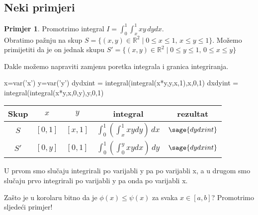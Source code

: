 \documentclass[a4paper, 11pt]{article}
\theoremstyle{plain}
\theoremstyle{plain}
\theoremstyle{definition}
\newtheorem{example}[definition]{Primjer}
\theoremstyle{remark}
\begin{document}
\subsection{Neki primjeri}
\begin{example}
    Promotrimo integral $I=\displaystyle \int_0^1 \int_x^1 xy\,dydx$.\\
    Obratimo pažnju na skup $S=\{(x,y) \in \mathbb{R}^2 \mid 0 \leq x \leq 1,\, x \leq y \leq1\}$.
    Možemo primijetiti da je on jednak skupu $S'=\{(x,y) \in \mathbb{R}^2 \mid 0 \leq y \leq 1,\, 0 \leq x \leq y \}$
    
   \noindent Dakle možemo napraviti zamjenu poretka integrala i granica integriranja.
    
    \begin{sagesilent}
    x=var('x')
    y=var('y')
    dydxint = integral(integral(x*y,y,x,1),x,0,1) 
    dxdyint = integral(integral(x*y,x,0,y),y,0,1) 

    \end{sagesilent}
    
\begin{center}
     \renewcommand{\arraystretch}{2.5}
    \begin{tabular}{ c c c c c }
     Skup & $x$     & $y$    & integral                                   & rezultat \bigstrut[b] \\ \hline
     $S$ & $[0,1]$ & $[x,1]$ & $\displaystyle \int_0^1 \left( \int_x^1 xy dy\right)\,dx$ & $\sage{dydxint}$ \bigstrut \\ \hline
     
     $S'$& $[0,y]$ & $[0,1]$ & $\displaystyle \int_0^1 \left(\int_0^y xy dx\right)\,dy$ & $\sage{dydxint}$ \bigstrut[t]
    \end{tabular}
\end{center}
\end{example}
\noindent U prvom smo slučaju integrirali po varijabli y pa po varijabli x, a u drugom smo slučaju prvo integrirali po varijabli y pa onda po varijabli x.\newline

Zašto je u korolaru bitno da je $\phi(x) \leq \psi(x)$ za svaka $x \in [a,b]$? Promotrimo sljedeći primjer!
\end{document}
